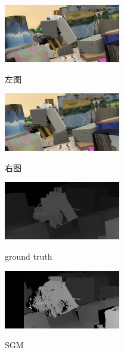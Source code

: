 \begin{figure}[!htb]
	\begin{minipage}{0.3\linewidth}
		\centerline{\includegraphics[width=2in]{figures/cmp_ft3d/l_000}}
		\vspace{-10pt}
		\centerline{左图}
	\end{minipage}
	\hfill
	\begin{minipage}{.3\linewidth}
		\centerline{\includegraphics[width=2in]{figures/cmp_ft3d/r_000}}
		\vspace{-10pt}
		\centerline{右图}
	\end{minipage}
	\hfill
	\begin{minipage}{0.3\linewidth}
		\centerline{\includegraphics[width=2in]{figures/cmp_ft3d/gt_000}}
		\vspace{-10pt}
		\centerline{ground truth}
	\end{minipage}
	\vfill
	\begin{minipage}{0.3\linewidth}
		\centerline{\includegraphics[width=2in]{figures/cmp_ft3d/sgm_000}}
		\vspace{-10pt}
		\centerline{SGM}
	\end{minipage}

\end{figure}
